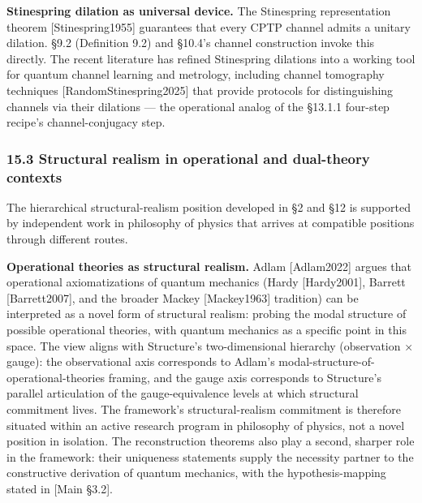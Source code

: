 \documentclass[
]{article}
\begin{document}
\textbf{Stinespring dilation as universal device.} The Stinespring
representation theorem {[}Stinespring1955{]} guarantees that every CPTP
channel admits a unitary dilation. §9.2 (Definition 9.2) and §10.4's
channel construction invoke this directly. The recent literature has
refined Stinespring dilations into a working tool for quantum channel
learning and metrology, including channel tomography techniques
{[}RandomStinespring2025{]} that provide protocols for distinguishing
channels via their dilations --- the operational analog of the §13.1.1
four-step recipe's channel-conjugacy step.

\hypertarget{structural-realism-in-operational-and-dual-theory-contexts}{%
\subsubsection{15.3 Structural realism in operational and dual-theory
contexts}\label{structural-realism-in-operational-and-dual-theory-contexts}}

The hierarchical structural-realism position developed in §2 and §12 is
supported by independent work in philosophy of physics that arrives at
compatible positions through different routes.

\textbf{Operational theories as structural realism.} Adlam
{[}Adlam2022{]} argues that operational axiomatizations of quantum
mechanics (Hardy {[}Hardy2001{]}, Barrett {[}Barrett2007{]}, and the
broader Mackey {[}Mackey1963{]} tradition) can be interpreted as a novel
form of structural realism: probing the modal structure of possible
operational theories, with quantum mechanics as a specific point in this
space. The view aligns with Structure's two-dimensional hierarchy
(observation × gauge): the observational axis corresponds to Adlam's
modal-structure-of-operational-theories framing, and the gauge axis
corresponds to Structure's parallel articulation of the
gauge-equivalence levels at which structural commitment lives. The
framework's structural-realism commitment is therefore situated within
an active research program in philosophy of physics, not a novel
position in isolation. The reconstruction theorems also play a second,
sharper role in the framework: their uniqueness statements supply the
necessity partner to the constructive derivation of quantum mechanics,
with the hypothesis-mapping stated in {[}Main §3.2{]}.
\end{document}
